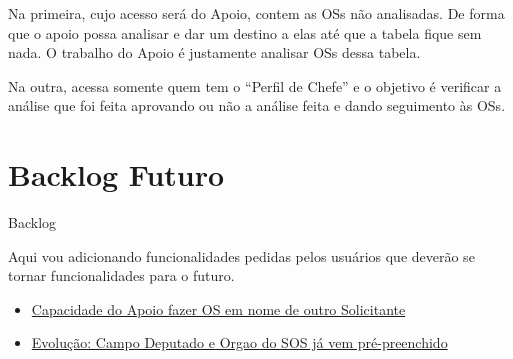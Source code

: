 Na primeira, cujo acesso será do Apoio, contem as OSs não analisadas. De forma que o apoio possa analisar e dar um destino a elas até que a tabela fique sem nada. O trabalho do Apoio é justamente analisar OSs dessa tabela.

Na outra, acessa somente quem tem o ``Perfil de Chefe'' e o objetivo é verificar a análise que foi feita aprovando ou não a análise feita e dando seguimento às OSs.

















\section{Backlog Futuro}

\hypertarget{backlog}{Backlog}

Aqui vou adicionando funcionalidades pedidas pelos usuários que deverão se tornar funcionalidades para o futuro.

\begin{itemize}
	\item \mschecknao \xspace \hyperlink{r1308-1}{Capacidade do Apoio fazer OS em nome de outro Solicitante}
	
	\item \mschecknao \xspace \hyperlink{r160522-1}{Evolução: Campo Deputado e Orgao do SOS já vem pré-preenchido}
	
	
	
	
	
	
	
\end{itemize}












